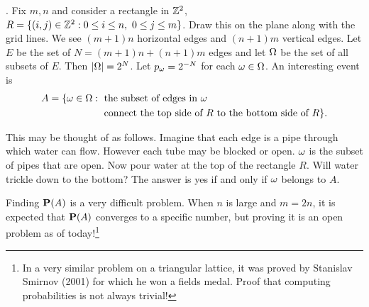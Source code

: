 \documentclass[preprint,  11pt]{amsart}
\begin{document}
\begin{example}. Fix $m,n$ and consider a rectangle in $\Z^{2}$, $R=\{(i,j)\in \Z^{2}\suchthat 0\le i\le n, \ 0\le j\le m\}$. Draw this on the plane along with the grid lines. We see $(m+1)n$ horizontal edges and $(n+1)m$ vertical edges. Let $E$ be the set of $N=(m+1)n+(n+1)m$ edges and let $\Ome$ be the set of all subsets of $E$. Then $|\Ome|=2^{N}$. Let $p_{\ome}=2^{-N}$ for each $\ome \in \Ome$. An interesting event is
\begin{align*}
A=\{\ome \in \Ome\suchthat & \mb{ the subset of edges in }\ome \\
 & \mb{ connect  the top side of }R \mb{ to the bottom side of }R\}.
\end{align*}

This may be thought of as follows. Imagine that each edge is a pipe through which water can flow. However each tube may be blocked or open. $\ome$ is the subset of pipes that are open. Now pour water at the top of the rectangle $R$. Will water trickle down to the bottom? The answer is yes if and only if $\ome$ belongs to $A$.

Finding $\P(A)$ is a very difficult problem. When $n$ is large and $m=2 n$, it is expected that $\P(A)$ converges to a specific number, but proving it is an open problem as of today!\footnote{In a very similar problem on a triangular lattice, it was proved by Stanislav Smirnov (2001) for which he won a fields medal. Proof that computing probabilities is not always trivial!}
\end{example}
\end{document}
